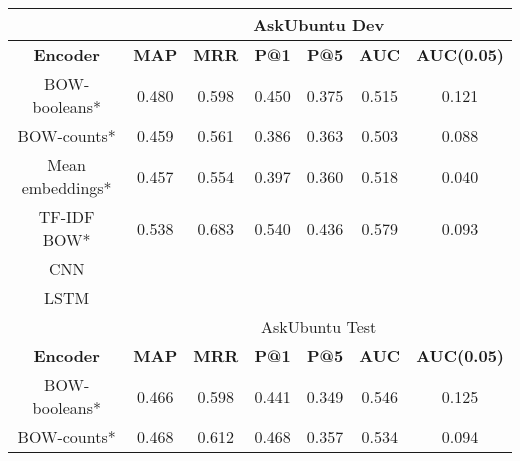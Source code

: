 \documentclass[12pt]{article}
\begin{document}
\begin{center}
		\begin{tabular}{|c||c|c|c|c||c|c|}
			\hline
			\cellcolor{gray!15}
				& \multicolumn{6}{c|}{\cellcolor{gray!15}AskUbuntu Dev} \\ \hline
			\cellcolor{gray!15}\textbf{Encoder} & \cellcolor{gray!15}\textbf{MAP} & \cellcolor{gray!15}\textbf{MRR}
				& \cellcolor{gray!15}\textbf{P@1} & \cellcolor{gray!15}\textbf{P@5}
				& \cellcolor{gray!15}\textbf{AUC} & \cellcolor{gray!15}\textbf{AUC(0.05)} \\ \hline\hline
			\cellcolor{red!15}BOW-booleans* & 0.480 & 0.598 & 0.450 & 0.375 & 0.515 & 0.121 \\ \hline
			\cellcolor{red!15}BOW-counts* & 0.459 & 0.561 & 0.386 & 0.363 & 0.503 & 0.088 \\ \hline
			\cellcolor{red!15}Mean embeddings* & 0.457 & 0.554 & 0.397 & 0.360 & 0.518 & 0.040 \\ \hline
			\cellcolor{red!15}TF-IDF BOW* & 0.538 & 0.683 & 0.540 & 0.436 & 0.579 & 0.093 \\ \hline\hline
			\cellcolor{green!15}CNN &  &  &  &  &  &  \\ \hline
			\cellcolor{green!15}LSTM &  &  &  &  &  &  \\ \hline
			\hline
			\cellcolor{gray!15}
				& \multicolumn{6}{c|}{\cellcolor{gray!15}AskUbuntu Test} \\ \hline
			\cellcolor{gray!15}\textbf{Encoder} & \cellcolor{gray!15}\textbf{MAP} & \cellcolor{gray!15}\textbf{MRR}
				& \cellcolor{gray!15}\textbf{P@1} & \cellcolor{gray!15}\textbf{P@5}
				& \cellcolor{gray!15}\textbf{AUC} & \cellcolor{gray!15}\textbf{AUC(0.05)} \\ \hline\hline
			\cellcolor{red!15}BOW-booleans* & 0.466 & 0.598 & 0.441 & 0.349 & 0.546 & 0.125 \\ \hline
			\cellcolor{red!15}BOW-counts* & 0.468 & 0.612 & 0.468 & 0.357 & 0.534 & 0.094 \\ \hline

\end{tabular}
\end{center}
\end{document}
